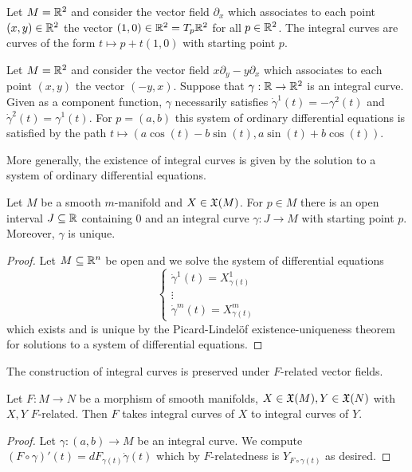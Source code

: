 \begin{example}
    Let $M=\mathbb{R}^{2}$ and consider the vector field $\partial_{x}$ which associates to each point $(x,y)\in\mathbb{R}^{2}$ the vector $(1,0)\in\mathbb{R}^{2}=T_{p}\mathbb{R}^{2}$ for all $p\in\mathbb{R}^{2}$. The integral curves are curves of the form $t\mapsto p+t(1,0)$ with starting point $p$.  
\end{example}
\begin{example}
    Let $M=\mathbb{R}^{2}$ and consider the vector field $x\partial_{y}-y\partial_{x}$ which associates to each point $(x,y)$ the vector $(-y, x)$. Suppose that $\gamma:\mathbb{R}\to\mathbb{R}^{2}$ is an integral curve. Given as a component function, $\gamma$ necessarily satisfies $\dot{\gamma}^{1}(t)=-\gamma^{2}(t)$ and $\dot{\gamma}^{2}(t)=\gamma^{1}(t)$. For $p=(a,b)$ this system of ordinary differential equations is satisfied by the path $t\mapsto(a\cos(t)-b\sin(t), a\sin(t)+b\cos(t))$. 
\end{example}
More generally, the existence of integral curves is given by the solution to a system of ordinary differential equations. 
\begin{theorem}\label{thm: existence-uniqueness theorem integral curves}
    Let $M$ be a smooth $m$-manifold and $X\in\mathfrak{X}(M)$. For $p\in M$ there is an open interval $J\subseteq\mathbb{R}$ containing 0 and an integral curve $\gamma:J\to M$ with starting point $p$. Moreover, $\gamma$ is unique. 
\end{theorem}
\begin{proof}
    Let $M\subseteq\mathbb{R}^{n}$ be open and we solve the system of differential equations 
    $$\begin{cases}
        \dot{\gamma}^{1}(t)=X^{1}_{\gamma(t)} \\
        \vdots \\
        \dot{\gamma}^{m}(t)=X^{m}_{\gamma(t)}
    \end{cases}$$
    which exists and is unique by the Picard-Lindel\"{o}f existence-uniqueness theorem for solutions to a system of differential equations. 
\end{proof}
The construction of integral curves is preserved under $F$-related vector fields. 
\begin{lemma}\label{lem: integral curves preserved by F-related fields}
    Let $F:M\to N$ be a morphism of smooth manifolds, $X\in\mathfrak{X}(M), Y\in\mathfrak{X}(N)$ with $X,Y$ $F$-related. Then $F$ takes integral curves of $X$ to integral curves of $Y$. 
\end{lemma}
\begin{proof}
    Let $\gamma:(a,b)\to M$ be an integral curve. We compute $(F\circ \gamma)'(t)=dF_{\gamma(t)}\dot{\gamma}(t)$ which by $F$-relatedness is $Y_{F\circ\gamma(t)}$ as desired. 
\end{proof}
